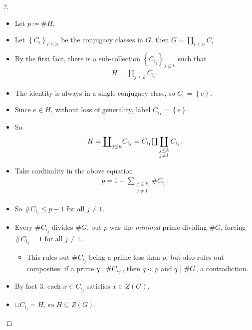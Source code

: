 \begin{proof}[?]

\envlist

\begin{itemize}
\item
  Let \(p \coloneqq\#H\).
\item
  Let \(\left\{{ C_i }\right\}_{i\leq n}\) be the conjugacy classes in
  \(G\), then \(G = {\coprod}_{i\leq n} C_i\)
\item
  By the first fact, there is a sub-collection
  \(\left\{{ C_{i_j}}\right\}_{j\leq k }\) such that
  \begin{align*}
  H = {\coprod}_{j\leq k} C_{i_j}
  .\end{align*}
\item
  The identity is always in a single conjugacy class, so
  \(C_e = \left\{{ e }\right\}\).
\item
  Since \(e\in H\), without loss of generality, label
  \(C_{i_1} = \left\{{ e }\right\}\).
\item
  So
  \begin{align*}
  H 
  = {\coprod}_{j\leq k} C_{i_j} 
  = C_{i_1}{\textstyle  \coprod} \displaystyle\displaystyle\coprod_{\substack{ j\leq k \\ j\neq 1} } C_{i_j} 
  .\end{align*}
\item
  Take cardinality in the above equation
  \begin{align*}
  p = 1 + \sum_{\substack{ j\leq k \\ j\neq 1 }} \# C_{i_j}
  .\end{align*}
\item
  So \(\# C_{i_j} \leq p-1\) for all \(j\neq 1\).
\item
  Every \(\# C_{i_j}\) divides \(\# G\), but \(p\) was the
  \emph{minimal} prime dividing \(\# G\), forcing \(\# C_{i_j} = 1\) for
  all \(j \neq 1\).

  \begin{itemize}
  \tightlist
  \item
    This rules out \(\# C_{i_j}\) being a prime less than \(p\), but
    also rules out composites: if a prime \(q\bigm|\# C_{i_j}\), then
    \(q<p\) and \(q\bigm|\# G\), a contradiction.
  \end{itemize}
\item
  By fact 3, each \(x\in C_{i_j}\) satisfies \(x\in Z(G)\).
\item
  \(\cup C_{i_j} = H\), so \(H \subseteq Z(G)\).
\end{itemize}

\end{proof}

